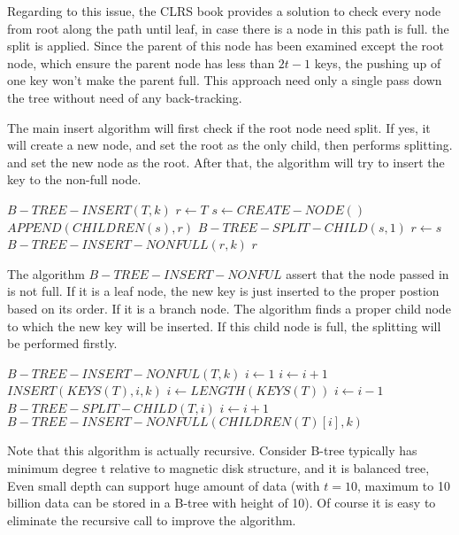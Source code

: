\documentclass{article}
\begin{document}
Regarding to this issue, the CLRS book provides a solution to check 
every node from root along the path until leaf, in case there is a 
node in this path is full. the split is applied. Since the parent
of this node has been examined except the root node, which ensure
the parent node has less than $2t-1$ keys, the pushing up of one
key won't make the parent full. This approach need only a single
pass down the tree without need of any back-tracking.

The main insert algorithm will first check if the root node need
split. If yes, it will create a new node, and set the root as the 
only child, then performs splitting. and set the new node as the
root. After that, the algorithm will try to insert the key to the
non-full node.

\begin{algorithmic}
\STATE $B-TREE-INSERT(T, k)$
  \STATE $r \leftarrow T$
    \STATE $s \leftarrow CREATE-NODE()$
    \STATE $APPEND(CHILDREN(s), r)$
    \STATE $B-TREE-SPLIT-CHILD(s, 1)$
    \STATE $r \leftarrow s$
  \ENDIF
  \STATE $B-TREE-INSERT-NONFULL(r, k)$
  \RETURN $r$
\end{algorithmic}

The algorithm $B-TREE-INSERT-NONFUL$ assert that the node passed in
is not full. If it is a leaf node, the new key is just inserted to 
the proper postion based on its order. If it is a branch node. The algorithm
finds a proper child node to which the new key will be inserted.
If this child node is full, the splitting will be performed firstly.

\begin{algorithmic}
\STATE $B-TREE-INSERT-NONFUL(T, k)$
    \STATE $i \leftarrow 1$
      \STATE $i \leftarrow i+1$
    \ENDWHILE
    \STATE $INSERT(KEYS(T), i, k)$
  \ELSE
    \STATE $i \leftarrow LENGTH(KEYS(T))$
      \STATE $i \leftarrow i-1$
    \ENDWHILE
      \STATE $B-TREE-SPLIT-CHILD(T, i)$
        \STATE $i \leftarrow i+1$
      \ENDIF
    \ENDIF
    \STATE $B-TREE-INSERT-NONFULL(CHILDREN(T)[i], k)$
  \ENDIF
\end{algorithmic}

Note that this algorithm is actually recursive. Consider B-tree typically
has minimum degree t relative to magnetic disk structure, and it is balanced 
tree, Even small depth can support huge amount of data 
(with $t=10$, maximum to 10 billion data can be stored in a B-tree with height of 10).
Of course it is easy to eliminate the recursive call to improve the algorithm.
\end{document}
